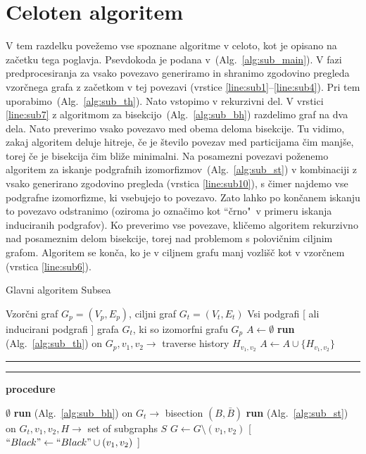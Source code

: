 \documentclass[a4paper, 12pt, ]{book}
\newcommand\Subalg[1]{%
	\Statex%
	\vspace*{-.7\baselineskip}%
	\hspace*{\dimexpr-\algorithmicindent-4pt\relax}%
	\rule{\textwidth}{0.4pt}%
	\Statex%
	
	\vspace*{-.7\baselineskip}%
	\Statex\hspace*{\dimexpr-\algorithmicindent-2pt\relax}%
	\rule{\textwidth}{0.4pt}%
	
	\Statex\hspace*{-\algorithmicindent}\textbf{procedure} #1%
}
\newcommand{\refalg}[1]{(Alg.~\ref{#1})}
\begin{document}
	\section {Celoten algoritem}
	\label{sub:subsea}
	V tem razdelku povežemo vse spoznane algoritme v celoto, kot je opisano na začetku tega poglavja. Psevdokoda je podana v~\refalg{alg:sub_main}.
	V fazi predprocesiranja za vsako povezavo generiramo in shranimo zgodovino pregleda vzorčnega grafa z začetkom v tej povezavi (vrstice
	\ref{line:sub1}--\ref{line:sub4}). Pri tem uporabimo~\refalg{alg:sub_th}. Nato vstopimo v rekurzivni del. V vrstici \ref{line:sub7} z algoritmom za 
	bisekcijo~\refalg{alg:sub_bh} razdelimo graf na dva dela. Nato preverimo vsako povezavo med obema deloma bisekcije. Tu vidimo, zakaj algoritem
	deluje hitreje, če je število povezav med particijama čim manjše, torej če je bisekcija čim bliže minimalni. Na posamezni povezavi poženemo algoritem
	za iskanje podgrafnih izomorfizmov~\refalg{alg:sub_st} v kombinaciji z vsako generirano zgodovino pregleda (vrstica \ref{line:sub10}), s čimer najdemo
	vse podgrafne izomorfizme, ki vsebujejo to povezavo. Zato lahko po končanem iskanju to povezavo odstranimo (oziroma jo označimo kot ``črno"~v
	primeru iskanja induciranih podgrafov). Ko preverimo vse povezave, kličemo algoritem rekurzivno nad posameznim delom bisekcije, torej nad problemom
	s polovičnim ciljnim grafom. Algoritem se konča, ko je v ciljnem grafu manj vozlišč kot v vzorčnem (vrstica \ref{line:sub6}).
	
\begin{algorithm}
\caption{Glavni algoritem Subsea}
\label{alg:sub_main}
\begin{algorithmic}[1]
	\Require Vzorčni graf $G_p = (V_p, E_p)$, ciljni graf $G_t = (V_t, E_t)$
	\Ensure Vsi podgrafi [ ali inducirani podgrafi ] grafa $G_t$, ki so izomorfni grafu $G_p$	
	 \State $A \gets \emptyset$						\label{line:sub1}
	 	\State \textbf{run} \refalg{alg:sub_th} on $G_p, v_1, v_2 \to $ traverse history $H_{v_1, v_2}$
	 	\State $A \gets A \cup \{ H_{v_1, v_2} \}$		\label{line:sub4}
	 \EndFor
	 \State {}

	
	\Subalg{\Call{SubIso}{$A, G_t$}}
		\Return $\emptyset$			\label{line:sub6}
	\EndIf
	\State \textbf{run} \refalg{alg:sub_bh} on $G_t \to$ bisection $(B, \bar B)$		\label{line:sub7}
			\State \textbf{run} \refalg{alg:sub_st} on $G_t, v_1, v_2, H \to $ set of subgraphs $S$	\label{line:sub10}
			\State $G \gets G \setminus (v_1, v_2)$ [ $``Black" \gets ``Black" \cup (v_1, v_2)$ ]
		\EndFor
	\EndFor
	\State {}
			
\end{algorithmic}
\end{algorithm}
\end{document}
